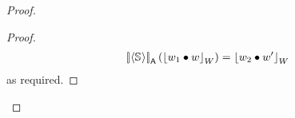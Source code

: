 \begin{theorem}
\begin{proof}
\begin{proof}
%
\begin{align*}
	\opSemA{\atomic{\seq{}}}{\reifyW{w_1 \composeW w}} = \reifyW{w_2 \composeW w'}
\end{align*}
%
as required.
%	
%	
%	
%	
%
%	
%	
%	

\end{proof}
\end{proof}
\end{theorem}
